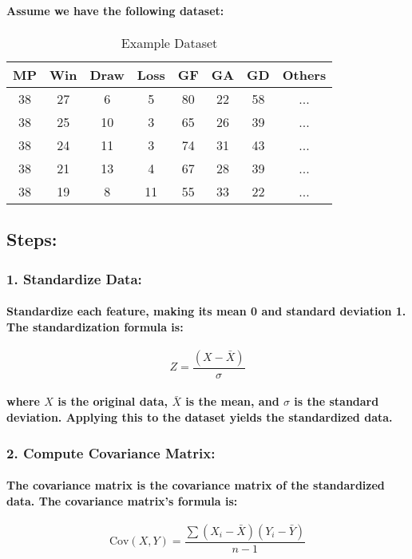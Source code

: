 \paragraph{Assume we have the following dataset:}
\begin{table}[h]
    \centering
    \caption{Example Dataset}
    \begin{tabular}{cccccccc}
        \toprule
        MP & Win & Draw & Loss & GF & GA & GD & Others \\
        \midrule
        38 & 27  & 6    & 5    & 80 & 22 & 58 & ...    \\
        38 & 25  & 10   & 3    & 65 & 26 & 39 & ...    \\
        38 & 24  & 11   & 3    & 74 & 31 & 43 & ...    \\
        38 & 21  & 13   & 4    & 67 & 28 & 39 & ...    \\
        38 & 19  & 8    & 11   & 55 & 33 & 22 & ...    \\
        \bottomrule
    \end{tabular}
\end{table}
% 
% 
% 
% 
% 
% 
\subsection*{Steps:}
% 
\subsubsection*{1. Standardize Data:}
% 
\paragraph{Standardize each feature, making its mean 0 and standard deviation 1. The standardization formula is:}
% 
\[ Z = \frac{(X - \bar{X})}{\sigma} \]
% 
\paragraph{where \(X\) is the original data, \(\bar{X}\) is the mean, and \(\sigma\) is the standard deviation. Applying this to the dataset yields the standardized data.}
% 
\subsubsection*{2. Compute Covariance Matrix:}
% 
\paragraph{The covariance matrix is the covariance matrix of the standardized data. The covariance matrix's formula is:}
% 
\[ \text{Cov}(X, Y) = \frac{\sum{(X_i - \bar{X})(Y_i - \bar{Y})}}{n-1} \]
% 
